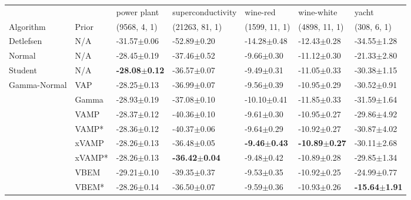 \begin{tabular}{lllllll}
\midrule
             &       &               power plant &         superconductivity &                 wine-red &                wine-white &                     yacht \\
Algorithm & Prior& (9568, 4, 1)& (21263, 81, 1)& (1599, 11, 1)& (4898, 11, 1)& (308, 6, 1)\\
\midrule
Detlefsen & N/A &           -31.57$\pm$0.06 &           -52.89$\pm$0.20 &          -14.28$\pm$0.48 &           -12.43$\pm$0.28 &           -34.55$\pm$1.28 \\
Normal & N/A &           -28.45$\pm$0.19 &           -37.46$\pm$0.52 &           -9.66$\pm$0.30 &           -11.12$\pm$0.30 &           -21.33$\pm$2.80 \\
Student & N/A &  \textbf{-28.08$\pm$0.12} &           -36.57$\pm$0.07 &           -9.49$\pm$0.31 &           -11.05$\pm$0.33 &           -30.38$\pm$1.15 \\
Gamma-Normal & VAP &           -28.25$\pm$0.13 &           -36.99$\pm$0.07 &           -9.56$\pm$0.39 &           -10.95$\pm$0.29 &           -30.52$\pm$0.91 \\
             & Gamma &           -28.93$\pm$0.19 &           -37.08$\pm$0.10 &          -10.10$\pm$0.41 &           -11.85$\pm$0.33 &           -31.59$\pm$1.64 \\
             & VAMP &           -28.37$\pm$0.12 &           -40.36$\pm$0.10 &           -9.61$\pm$0.30 &           -10.95$\pm$0.27 &           -29.86$\pm$4.92 \\
             & VAMP* &           -28.36$\pm$0.12 &           -40.37$\pm$0.06 &           -9.64$\pm$0.29 &           -10.92$\pm$0.27 &           -30.87$\pm$4.02 \\
             & xVAMP &           -28.26$\pm$0.13 &           -36.48$\pm$0.05 &  \textbf{-9.46$\pm$0.43} &  \textbf{-10.89$\pm$0.27} &           -30.11$\pm$2.68 \\
             & xVAMP* &           -28.26$\pm$0.13 &  \textbf{-36.42$\pm$0.04} &           -9.48$\pm$0.42 &           -10.89$\pm$0.28 &           -29.85$\pm$1.34 \\
             & VBEM &           -29.21$\pm$0.10 &           -39.35$\pm$0.37 &           -9.53$\pm$0.35 &           -10.92$\pm$0.25 &           -24.99$\pm$0.77 \\
             & VBEM* &           -28.26$\pm$0.14 &           -36.50$\pm$0.07 &           -9.59$\pm$0.36 &           -10.93$\pm$0.26 &  \textbf{-15.64$\pm$1.91} \\
\bottomrule
\end{tabular}

